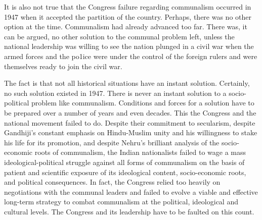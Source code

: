 It is also not true that the Congress failure regarding communalism occurred in 1947 when it accepted the partition of the country. Perhaps, there was no other option at the time. Communalism had already advanced too far. There was, it can be argued, no other solution to the communal problem left, unless the national leadership was willing to see the nation plunged in a civil war when the armed forces and the po1ice were under the control of the foreign rulers and were themselves ready to join the civil war. 

The fact is that not all historical situations have an instant solution. Certainly, no such solution existed in 1947. There is never an instant solution to a socio-political problem like communalism. Conditions and forces for a solution have to be prepared over a number of years and even decades. This the Congress and the national movement failed to do. Despite their commitment to secularism, despite Gandhiji’s constant emphasis on Hindu-Muslim unity and his willingness to stake his life for its promotion, and despite Nehru’s brilliant analysis of the socio­ economic roots of communalism, the Indian nationalists failed to wage a mass ideological-political struggle against all forms of communalism on the basis of patient and scientific exposure of its ideological content, socio-economic roots, and political consequences. In fact, the Congress relied too heavily on negotiations with the communal leaders and failed to evolve a viable and effective long-term strategy to combat communalism at the political, ideological and cultural levels. The Congress and its leadership have to be faulted on this count.
